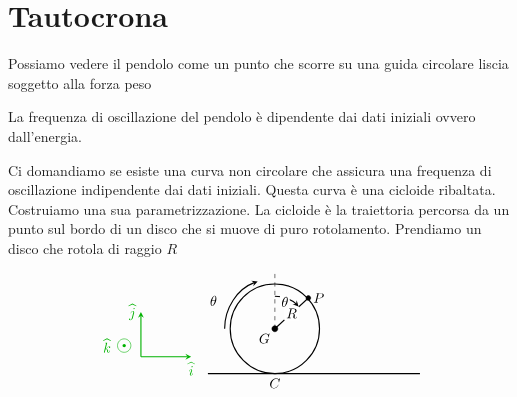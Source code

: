 \chapter{Tautocrona}
Possiamo vedere il pendolo come un punto che scorre su una guida circolare liscia soggetto alla forza peso

La frequenza di oscillazione del pendolo è dipendente dai dati iniziali ovvero dall'energia.

Ci domandiamo se esiste una curva non circolare che assicura una frequenza di oscillazione indipendente dai dati iniziali. Questa curva è una cicloide ribaltata. Costruiamo una sua parametrizzazione. La cicloide è la traiettoria percorsa da un punto sul bordo di un disco che si muove di puro rotolamento. Prendiamo un disco che rotola di raggio \(R\)

\[
\begin{tikzpicture}[scale=1.4, >=stealth]
  \draw[green!70!black, thick, ->] (-2.4, 0.3) -- (-2.4, 1.1) node[left] {\(\widehat{j}\)};
  \draw[green!70!black, thick, ->] (-2.4, 0.3) -- (-1.5, 0.3) node[below] {\(\widehat{i}\)};

  \draw[green!70!black] (-2.7, 0.5) circle (0.12);
  \fill[green!70!black] (-2.7, 0.5) circle (0.03);
  \node[green!70!black, left] at (-2.85, 0.5) {\(\widehat{k}\)};

  \draw[thick] (-1.2, 0) -- (2.6, 0);
  \draw[thick] (0, 0.8) circle (0.8);
  \filldraw[black] (0, 0.8) circle (1.5pt);
  \node[below left] at (0, 0.8) {\(G\)};
  \node[below] at (0, 0) {\(C\)};

  \draw[dashed] (0, 0.8) -- (0, 1.8);
  \draw[thick] (0, 0.8) -- (0.6, 1.35);
  \filldraw[black] (0.6, 1.35) circle (1.2pt) node[right] {\(P\)};

  \node[fill=white, inner sep=1.5pt] at (0.3, 1.075) {\(R\)};

  \draw[thick, ->] (-0.9, 0.8) arc (180:110:0.9);
  \node at (-1.1, 1.3) {\(\theta\)};

  \draw[thick, ->] (0, 1.38) arc (90:43:0.58);
  \node[fill=white, inner sep=1pt] at (0.18, 1.28) {\(\theta\)};
\end{tikzpicture}
\]

